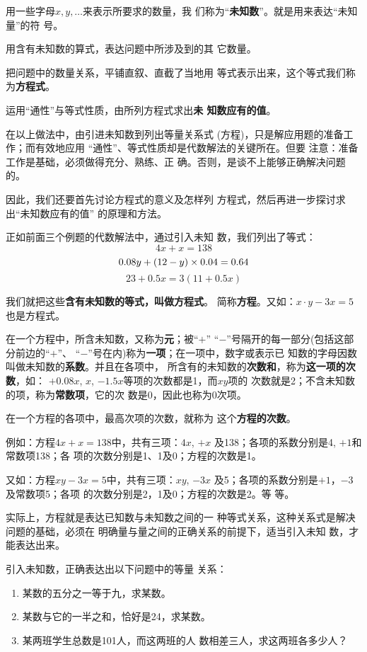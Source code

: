    用一些字母$x,  y,\ldots$来表示所要求的数量，我
们称为“\textbf{未知数}”。就是用来表达“未知量”的符
号。

    用含有未知数的算式，表达问题中所涉及到的其
它数量。

    把问题中的数量关系，平铺直叙、直截了当地用
等式表示出来，这个等式我们称为\textbf{方程式}。

    运用“通性”与等式性质，由所列方程式求出\textbf{未
知数应有的值}。

    在以上做法中，由引进未知数到列出等量关系式
  (方程)，只是解应用题的准备工作；而有效地应用
  “通性”、等式性质却是代数解法的关键所在。但要
注意：准备工作是基础，必须做得充分、熟练、正
确。否则，是谈不上能够正确解决问题的。

    因此，我们还要首先讨论方程式的意义及怎样列
方程式，然后再进一步探讨求出“未知数应有的值”
的原理和方法。

    正如前面三个例题的代数解法中，通过引入未知
数，我们列出了等式：
\[4x+x=138\]
\[0.08y+(12-y)\times 0.04=0.64\]
\[23+0.5x=3(11+0.5x)\]

我们就把这些\textbf{含有未知数的等式，叫做方程式}。
简称\textbf{方程}。又如：$x\cdot y-3x=5$也是方程式。

在一个方程中，所含未知数，又称为\textbf{元}；被“$+$”
“$-$”号隔开的每一部分(包括这部分前边的“$+$”、
“$-$”号在内)称为\textbf{一项}；在一项中，数字或表示已
知数的字母因数叫做未知数的\textbf{系数}。并且在各项中，
所含有的未知数的\textbf{次数和}，称为\textbf{这一项的次数}，如：
$+ 0. 08x$,  $x$, $-1.5x$等项的次数都是1，而$xy$项的
次数就是2；不含未知数的项，称为\textbf{常数项}，它的次
数是0，因此也称为0次项。

  在一个方程的各项中，最高次项的次数，就称为
这个\textbf{方程的次数}。

  例如：方程$4x+x=138$中，共有三项：$4 x$, $+x$
及138；各项的系数分别是4, $+1$和常数项138；各
项的次数分别是1、1及0；方程的次数是1。

  又如：方程$xy-3x=5$中，共有三项：$xy$, $-3x$
及5；各项的系数分别是$+1$，$-3$及常数项5；各项
的次数分别是2，1及0；方程的次数是2。等
等。

  实际上，方程就是表达已知数与未知数之间的一
种等式关系，这种关系式是解决问题的基础，必须在
明确量与量之间的正确关系的前提下，适当引入未知
数，才能表达出来。

\begin{example}
引入未知数，正确表达出以下问题中的等量
关系：
\begin{enumerate}
    \item 某数的五分之一等于九，求某数。
    \item 某数与它的一半之和，恰好是24，求某数。
    \item 某两班学生总数是101人，而这两班的人
    数相差三人，求这两班各多少人？
\end{enumerate}
\end{example}

